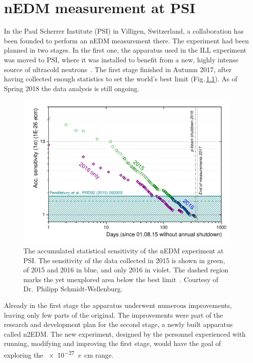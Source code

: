 \chapter{nEDM measurement at PSI}
\label{ch:nedm-at-psi-apparatus}

In the Paul Scherrer Institute (PSI) in Villigen, Switzerland, a collaboration has been founded to perform an nEDM measurement there.
The experiment had been planned in two stages.
In the first one, the apparatus used in the ILL experiment was moved to PSI, where it was installed to benefit from a new, highly intense source of ultracold neutrons~\cite{Lauss2014}.
The first stage finished in Autumn 2017, after having collected enough statistics to set the world's best limit (Fig.\,\ref{fig:nEDM_accumulated_sensitivity}).
As of Spring 2018 the data analysis is still ongoing.

\begin{figure}
  \centering
  \includegraphics[width=\linewidth]{gfx/nEDMatPSI/accumulated_sensitivity.pdf}
  \caption{The accumulated statistical sensitivity of the nEDM experiment at PSI\@.
  The sensitivity of the data collected in 2015 is shown in green, of 2015 and 2016 in blue, and only 2016 in violet.
  The dashed region marks the yet unexplored area below the best limit~\cite{Pendlebury2015}.
  Courtesy of Dr.\ Philipp Schmidt-Wellenburg.}\label{fig:nEDM_accumulated_sensitivity}
\end{figure}

Already in the first stage the apparatus underwent numerous improvements, leaving only few parts of the original.
The improvements were part of the research and development plan for the second stage, a newly built apparatus called n2EDM\@.
The new experiment, designed by the personnel experienced with running, modifying and improving the first stage, would have the goal of exploring the \SI{e-27}{\elementarycharge\centi\meter} range.




